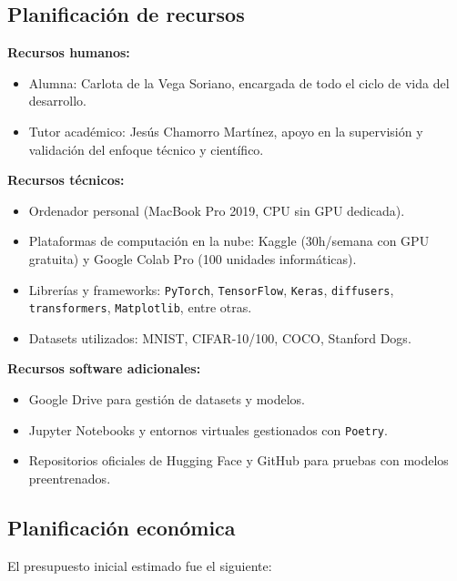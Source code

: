 \subsection{Planificación de recursos}

\textbf{Recursos humanos:}
\begin{itemize}
    \item Alumna: Carlota de la Vega Soriano, encargada de todo el ciclo de vida del desarrollo.
    \item Tutor académico: Jesús Chamorro Martínez, apoyo en la supervisión y validación del enfoque técnico y científico.
\end{itemize}

\textbf{Recursos técnicos:}
\begin{itemize}
    \item Ordenador personal (MacBook Pro 2019, CPU sin GPU dedicada).
    \item Plataformas de computación en la nube: Kaggle (30h/semana con GPU gratuita) y Google Colab Pro (100 unidades informáticas).
    \item Librerías y frameworks: \texttt{PyTorch}, \texttt{TensorFlow}, \texttt{Keras}, \texttt{diffusers}, \texttt{transformers}, \texttt{Matplotlib}, entre otras.
    \item Datasets utilizados: MNIST, CIFAR-10/100, COCO, Stanford Dogs.
\end{itemize}

\textbf{Recursos software adicionales:}
\begin{itemize}
    \item Google Drive para gestión de datasets y modelos.
    \item Jupyter Notebooks y entornos virtuales gestionados con \texttt{Poetry}.
    \item Repositorios oficiales de Hugging Face y GitHub para pruebas con modelos preentrenados.
\end{itemize}

\subsection{Planificación económica}

El presupuesto inicial estimado fue el siguiente:

